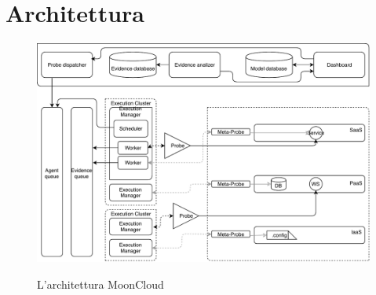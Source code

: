 \section{Architettura}\label{sec:mooncloud-archi}

\begin{figure}
	\includegraphics[scale=0.6]{img/mooncloud_archi}
	\label{fig:mooncloud-archi}
	\caption{L'architettura MoonCloud}
\end{figure}

